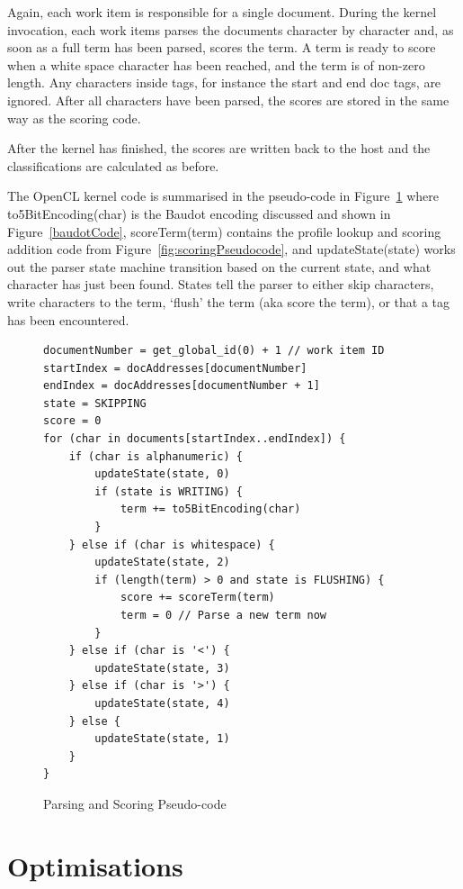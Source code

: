 Again, each work item is responsible for a single document. During the kernel
invocation, each work items parses the documents character by character and, as
soon as a full term has been parsed, scores the term. A term is ready to score
when a white space character has been reached, and the term is of non-zero
length. Any characters inside tags, for instance the start and end doc tags, are
ignored. After all characters have been parsed, the scores are stored in the
same way as the scoring code.

After the kernel has finished, the scores are written back to the host and the
classifications are calculated as before.

The OpenCL kernel code is summarised in the pseudo-code in
Figure~\ref{fig:parsingScoringPseudocode} where to5BitEncoding(char) is the
Baudot encoding discussed and shown in Figure~\ref{baudotCode}, scoreTerm(term)
contains the profile lookup and scoring addition code from
Figure~\ref{fig:scoringPseudocode}, and updateState(state) works out the parser
state machine transition based on the current state, and what character has just
been found. States tell the parser to either skip characters, write characters
to the term, `flush' the term (aka score the term), or that a tag has been
encountered.

\begin{figure}
\small\begin{verbatim}
documentNumber = get_global_id(0) + 1 // work item ID
startIndex = docAddresses[documentNumber]
endIndex = docAddresses[documentNumber + 1]
state = SKIPPING
score = 0
for (char in documents[startIndex..endIndex]) {
    if (char is alphanumeric) {
        updateState(state, 0)
        if (state is WRITING) {
            term += to5BitEncoding(char)
        }
    } else if (char is whitespace) {
        updateState(state, 2)
        if (length(term) > 0 and state is FLUSHING) {
            score += scoreTerm(term)
            term = 0 // Parse a new term now
        }
    } else if (char is '<') {
        updateState(state, 3)
    } else if (char is '>') {
        updateState(state, 4)
    } else {
        updateState(state, 1)
    }
}
\end{verbatim}
\caption{Parsing and Scoring Pseudo-code}
\label{fig:parsingScoringPseudocode}
\end{figure}

\section{Optimisations}

